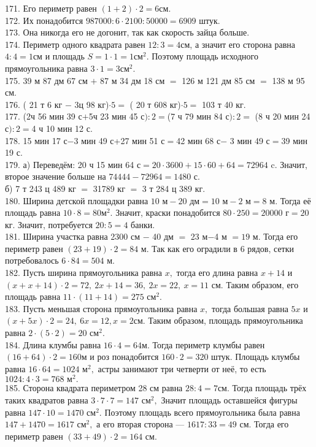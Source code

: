 171. Его периметр равен $(1+2)\cdot2=6$см.\\
172. Их понадобится $987000:6\cdot2100:50000=6909$ штук.\\
173. Она никогда его не догонит, так как скорость зайца больше.\\
174. Периметр одного квадрата равен $12:3=4$см, а значит его сторона равна $4:4=1$см и площадь $S=1\cdot1=1\text{см}^2.$ Поэтому площадь исходного прямоугольника равна $3\cdot1=3\text{см}^2.$\\
175. 39 м 87 дм 67 см $+$ 87 м 34 дм 18 см $=$ 126 м 121 дм 85 см $=$ 138 м 95 см.\\
176. ( 21 т 6 кг $-$ 3ц 98 кг)$\cdot5=$ ( 20 т 608 кг)$\cdot5=$ 103 т 40 кг.\\
177. (2ч 56 мин 39 с$+$5ч 23 мин 45 с$):2=$(7 ч 79 мин 84 с$):2=$ (8 ч 20 мин 24 с$):2=$4 ч 10 мин 12 с.\\
178. 15 мин 17 с$-$3 мин 49 с+27 мин 51 с$=$42 мин 68 с$-$ 3 мин 49 с$=$39 мин 19 с.\\
179. а) Переведём: 20 ч 15 мин 64 с$=20\cdot3600+15\cdot60+64=72964$ c. Значит, второе значение больше на $74444-72964=1480$ с.\\
б) 7 т 243 ц 489 кг $=$ 31789 кг $=$ 3 т 284 ц 389 кг.\\
180. Ширина детской площадки равна $10\text{ м}-20 \text{ дм}=10\text{ м}-2\text{ м}=8\text{ м}.$ Тогда её площадь равна $10\cdot8=80\text{м}^2.$ Значит, краски понадобится $80\cdot250=20000\text{ г}=20$кг. Значит, потребуется $20:5=4$ банки.\\
181. Ширина участка равна 2300 см $-$ 40 дм $=$ 23 м$-$4 м $=19$ м. Тогда его периметр равен $(23+19)\cdot2=84$ м. Так как его оградили в 6 рядов, сетки потребовалось $6\cdot84=504$ м.\\
182. Пусть ширина прямоугольника равна $x,$ тогда его длина равна $x+14$ и $(x+x+14)\cdot2=72,\ 2x+14=36,\ 2x=22,\ x=11$ см. Таким образом, его площадь равна $11\cdot(11+14)=275\text{ см}^2.$\\
183. Пусть меньшая сторона прямоугольника равна $x,$ тогда большая равна $5x$ и $(x+5x)\cdot2=24,\ 6x=12, x=2$см. Таким образом, площадь прямоугольника равна $2\cdot(5\cdot2)=20\text{ см}^2.$\\
184. Длина клумбы равна $16\cdot4=64$м. Тогда периметр клумбы равен $(16+64)\cdot2=160$м и роз понадобится $160\cdot2=320$ штук. Площадь клумбы равна $16\cdot64=1024\text{ м}^2,$ астры занимают три четверти от неё, то есть $1024:4\cdot3=768\text{ м}^2.$\\
185. Сторона квадрата периметром 28 см равна $28:4=7$см. Тогда площадь трёх таких квадратов равна $3\cdot7\cdot7=147\text{ см}^2,$ Значит площадь оставшейся фигуры равна $147\cdot10=1470\text{ см}^2.$ Поэтому площадь всего прямоугольника была равна $147+1470=1617\text{ см}^2,$ а его вторая сторона --- $1617:33=49$ см. Тогда его периметр равен $(33+49)\cdot2=164$ см.\\

